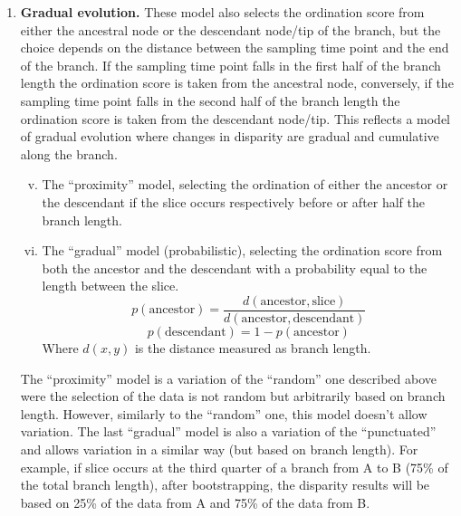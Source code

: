 \documentclass[12pt,a4paper]{article}
\begin{document}
\begin{enumerate}
    \item{\textbf{Gradual evolution.}}
    These model also selects the ordination score from either the ancestral node or the descendant node/tip of the branch, but the choice depends on the distance between the sampling time point and the end of the branch.
    If the sampling time point falls in the first half of the branch length the ordination score is taken from the ancestral node, conversely, if the sampling time point falls in the second half of the branch length the ordination score is taken from the descendant node/tip.
    This reflects a model of gradual evolution where changes in disparity are gradual and cumulative along the branch.
  
    \begin{enumerate}[(i)]
    \setcounter{enumii}{4}
    \item The ``proximity'' model, selecting the ordination of either the ancestor or the descendant if the slice occurs respectively before or after half the branch length.
    \item The ``gradual'' model (probabilistic), selecting the ordination score from both the ancestor and the descendant with a probability equal to the length between the slice.
          \begin{equation}
              p(\text{ancestor}) = \frac{d(\text{ancestor},\text{slice})}{d(\text{ancestor},\text{descendant})}
          \end{equation}
          \begin{equation}
              p(\text{descendant}) = 1 - p(\text{ancestor})
          \end{equation}
    \noindent Where $d(x,y)$ is the distance measured as branch length.
    \end{enumerate}

    The ``proximity'' model is a variation of the ``random'' one described above were the selection of the data is not random but arbitrarily based on branch length.
    However, similarly to the ``random'' one, this model doesn't allow variation.
    The last ``gradual'' model is also a variation of the ``punctuated'' and allows variation in a similar way (but based on branch length).
    For example, if slice occurs at the third quarter of a branch from A to B (75\% of the total branch length), after bootstrapping, the disparity results will be based on 25\% of the data from A and 75\% of the data from B.
\end{enumerate}
\end{document}
